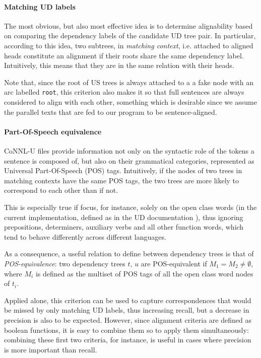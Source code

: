 \documentclass[11pt]{article}
\begin{document}
\paragraph{Matching UD labels}
The most obvious, but also most effective idea is to determine alignability based on comparing the dependency labels of the candidate UD tree pair. 
In particular, according to this idea, two subtrees, in \textit{matching context}, i.e. attached to aligned heads constitute an alignment if their roots share the same dependency label. 
Intuitively, this means that they are in the same relation with their heads.

Note that, since the root of US trees is always attached to a a fake node with an arc labelled \texttt{root}, this criterion also makes it so that full sentences are always considered to align with each other, something which is desirable since we assume the parallel texts that are fed to our program to be sentence-aligned.

\paragraph{Part-Of-Speech equivalence}
CoNNL-U files provide information not only on the syntactic role of the tokens a sentence is composed of, but also on their grammatical categories, represented as Universal Part-Of-Speech (POS) tags. 
Intuitively, if the nodes of two trees in matching contexts have the same POS tags, the two trees are more likely to correspond to each other than if not. 

This is especially true if focus, for instance, solely on the open class words (in the current implementation, defined as in the UD documentation \cite{TODO:}), thus ignoring prepositions, determiners, auxiliary verbs and all other function words, which tend to behave differently across different languages.

As a consequence, a useful relation to define between dependency trees is that of \textit{POS-equivalence}: two dependency trees $t$, $u$ are POS-equivalent if $M_1 = M_2 \neq \emptyset$, where $M_i$ is defined as the multiset of POS tags of all the open class word nodes of $t_i$. 

Applied alone, this criterion can be used to capture correspondences that would be missed by only matching UD labels, thus increasing recall, but a decrease in precision is also to be expected. 
However, since alignment criteria are defined as boolean functions, it is easy to combine them so to apply them simultaneously: combining these first two criteria, for instance, is useful in cases where precision is more important than recall.
\end{document}
